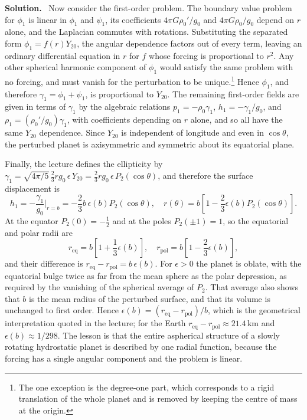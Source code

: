 \documentclass[a4paper,12pt]{paper}
\newenvironment{solution}{\par\noindent\textbf{Solution.}\ }{\par\medskip}
\begin{document}
\begin{solution}
Now consider the first-order problem. The boundary value problem for $\phi_{1}$ is linear in
$\phi_{1}$ and $\psi_{1}$, its coefficients $4\pi G\rho_{0}'/g_{0}$ and $4\pi G\rho_{0}/g_{0}$ depend on
$r$ alone, and the Laplacian commutes with rotations. Substituting the separated form
$\phi_{1}=f(r)Y_{20}$, the angular dependence factors out of every term, leaving an ordinary
differential equation in $r$ for $f$ whose forcing is proportional to $r^{2}$. Any other spherical
harmonic component of $\phi_{1}$ would satisfy the same problem with no forcing, and must vanish
for the perturbation to be unique.\footnote{The one exception is the degree-one part, which
corresponds to a rigid translation of the whole planet and is removed by keeping the centre of
mass at the origin.} Hence $\phi_{1}$, and therefore
$\gamma_{1}=\phi_{1}+\psi_{1}$, is proportional to $Y_{20}$. The remaining first-order fields are given
in terms of $\gamma_{1}$ by the algebraic relations $p_{1}=-\rho_{0}\gamma_{1}$, $h_{1}=-\gamma_{1}/g_{0}$,
and $\rho_{1}=(\rho_{0}'/g_{0})\gamma_{1}$, with coefficients depending on $r$ alone, and so all have the
same $Y_{20}$ dependence. Since $Y_{20}$ is independent of longitude and even in $\cos\theta$, the
perturbed planet is axisymmetric and symmetric about its equatorial plane.

Finally, the lecture defines the ellipticity by
$\gamma_{1}=\sqrt{4\pi/5}\,\frac{2}{3}rg_{0}\,\epsilon\,Y_{20}=\frac{2}{3}rg_{0}\,\epsilon\,P_{2}(\cos\theta)$,
and therefore the surface displacement is
\begin{equation}
h_{1}=-\frac{\gamma_{1}}{g_{0}}\bigg|_{r=b}=-\frac{2}{3}b\,\epsilon(b)P_{2}(\cos\theta),
\quad r(\theta)=b\left[1-\frac{2}{3}\epsilon(b)P_{2}(\cos\theta)\right].
\label{eq:20}
\end{equation}
At the equator $P_{2}(0)=-\frac{1}{2}$ and at the poles $P_{2}(\pm1)=1$, so the equatorial and polar
radii are
\begin{equation}
r_{\mathrm{eq}}=b\left[1+\frac{1}{3}\epsilon(b)\right],\quad r_{\mathrm{pol}}=b\left[1-\frac{2}{3}\epsilon(b)\right],
\label{eq:21}
\end{equation}
and their difference is $r_{\mathrm{eq}}-r_{\mathrm{pol}}=b\,\epsilon(b)$. For $\epsilon>0$ the planet is
oblate, with the equatorial bulge twice as far from the mean sphere as the polar depression, as
required by the vanishing of the spherical average of $P_{2}$. That average also shows that $b$ is the
mean radius of the perturbed surface, and that its volume is unchanged to first order. Hence
$\epsilon(b)=(r_{\mathrm{eq}}-r_{\mathrm{pol}})/b$, which is the geometrical interpretation quoted in
the lecture; for the Earth $r_{\mathrm{eq}}-r_{\mathrm{pol}}\approx21.4\,\mathrm{km}$ and
$\epsilon(b)\approx1/298$. The lesson is that the entire aspherical structure of a slowly rotating
hydrostatic planet is described by one radial function, because the forcing has a single angular
component and the problem is linear.
\end{solution}
\end{document}
